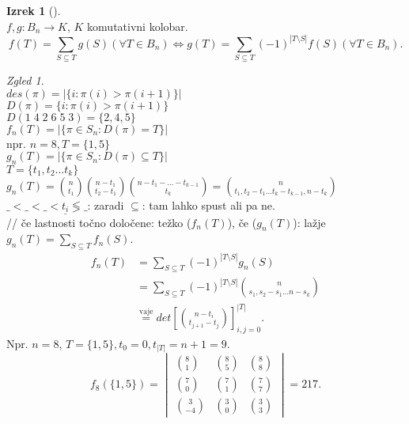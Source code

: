 \documentclass[a4paper, 12pt]{book}
\theoremstyle{definition}
\newtheorem{theorem}[counter]{Izrek}
\theoremstyle{remark}
\newtheorem*{exmp}{Zgled}
\begin{document}
\begin{theorem}[] \text{} \\
  $f, g: B_n \to K$, $K$ komutativni kolobar.
  \begin{equation*}f(T) = \sum_{S \subseteq T} g(S) (\forall T \in B_n) \iff
    g(T) = \sum_{S \subseteq T} (-1)^{|T \setminus S|} f(S) (\forall T \in B_n).
  \end{equation*}
\end{theorem}
\begin{exmp} \text{} \\
  $des(\pi) = |\{i : \pi(i) > \pi(i+1)\}|$ \\
  $D(\pi) = \{i : \pi(i) > \pi(i+1)\}$ \\
  $D(1\;4\;2\;6\;5\;3) = \{2,4,5\}$ \\
  $f_n(T) = |\{\pi \in S_n: D(\pi) = T\}|$ \\
  npr. $n=8, T=\{1,5\}$ \\
  $g_n(T) = |\{\pi \in S_n: D(\pi) \subseteq T\}|$ \\
  $T = \{t_1, t_2 \dots t_k\}$ \\
  $g_n(T) = \binom{n}{t_1} \binom{n-t_1}{t_2-t_1} \binom{n-t_1-\dots-t_{k-1}}{t_k}
    = \binom{n}{t_1,t_2-t_1 \dots t_k-t_{k-1}, n-t_k}$ \\
  $\_ < \_ < \_ < \underline{t_i} \lessgtr \_$: zaradi $\subseteq$: tam lahko spust ali pa ne. \\
  // če lastnosti točno določene: težko ($f_n(T)$), če  ($g_n(T)$): lažje \\
  $g_n(T) = \sum_{S \subseteq T} f_n(S)$.
  \begin{align*}
    f_n(T) &= \sum_{S \subseteq T} (-1)^{|T \setminus S|} g_n(S) \\
    &= \sum_{S \subseteq T} (-1)^{|T \setminus S|} \binom{n}{s_1, s_2-s_1 \dots n-s_k} \\
    &\stackrel{\text{vaje}}{=} det\left[\binom{n-t_i}{t_{j+1}-t_j}\right]_{i,j=0}^{|T|}.
  \end{align*}
  Npr. $n=8$, $T=\{1,5\}, t_0=0, t_{|T|}=n+1=9$.
  \begin{equation*}
    f_8(\{1,5\}) = \begin{vmatrix}
      \binom{8}{1} & \binom{8}{5} & \binom{8}{8} \\
      \binom{7}{0} & \binom{7}{1} & \binom{7}{7} \\
      \binom{3}{-4} & \binom{3}{0} & \binom{3}{3}
    \end{vmatrix} = 217.
  \end{equation*}
\end{exmp}
\end{document}
